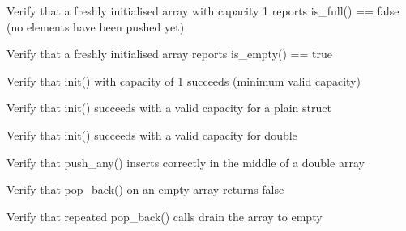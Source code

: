 \begin{DoxyRefList}
%
Verify that a freshly initialised array with capacity 1 reports is\+\_\+full() == false (no elements have been pushed yet)  
\item[Global \doxylink{test__array_8cpp_a8d7eb67c1b5bce7b29c6cf479c0fa065}{TEST\+\_\+F} (\doxylink{classArrayInitTest}{Array\+Init\+Test}, Init\+Array\+Is\+Empty)]\label{test__test000005}%
%
Verify that a freshly initialised array reports is\+\_\+empty() == true  
\item[Global \doxylink{test__array_8cpp_a0da354dc86095c3f0ec10aee17cf9941}{TEST\+\_\+F} (\doxylink{classArrayInitTest}{Array\+Init\+Test}, Init\+Capacity\+One\+Succeeds)]\label{test__test000004}%
%
Verify that init() with capacity of 1 succeeds (minimum valid capacity)  
\item[Global \doxylink{test__array_8cpp_a6bbe067fe8061cfeb61db510dd186cc9}{TEST\+\_\+F} (\doxylink{classArrayInitTest}{Array\+Init\+Test}, Init\+Point\+Succeeds)]\label{test__test000003}%
%
Verify that init() succeeds with a valid capacity for a plain struct  
\item[Global \doxylink{test__array_8cpp_af6172d96b49e1795de6761cafd82977c}{TEST\+\_\+F} (\doxylink{classArrayInitTest}{Array\+Init\+Test}, Init\+Double\+Succeeds)]\label{test__test000002}%
%
Verify that init() succeeds with a valid capacity for double  
\item[Global \doxylink{test__array_8cpp_a6b8934a2539863fecb49ecfcf1d78410}{TEST\+\_\+F} (\doxylink{classArrayInitTest}{Array\+Init\+Test}, Push\+Any\+Double\+Middle\+Insertion)]\label{test__test000029}%
%
Verify that push\+\_\+any() inserts correctly in the middle of a double array  
\item[Global \doxylink{test__array_8cpp_ad15f4ed693c68912dc886b72ee14a2f3}{TEST\+\_\+F} (\doxylink{classArrayInitTest}{Array\+Init\+Test}, Pop\+Back\+On\+Empty\+Array\+Returns\+False)]\label{test__test000037}%
%
Verify that pop\+\_\+back() on an empty array returns false  
\item[Global \doxylink{test__array_8cpp_af5d1c6a054a4a8343792c119c71dc5ed}{TEST\+\_\+F} (\doxylink{classArrayInitTest}{Array\+Init\+Test}, Pop\+Back\+Drains\+To\+Empty)]\label{test__test000036}%
%
Verify that repeated pop\+\_\+back() calls drain the array to empty  
\item[Global \doxylink{test__array_8cpp_aa185ecfb4848b8b17aef491778ba9fc0}{TEST\+\_\+F} (\doxylink{classArrayInitTest}{Array\+Init\+Test}, Pop\+Back\+Point\+Removes\+Last\+Element)]\label{test__test000035}%

\end{DoxyRefList}
